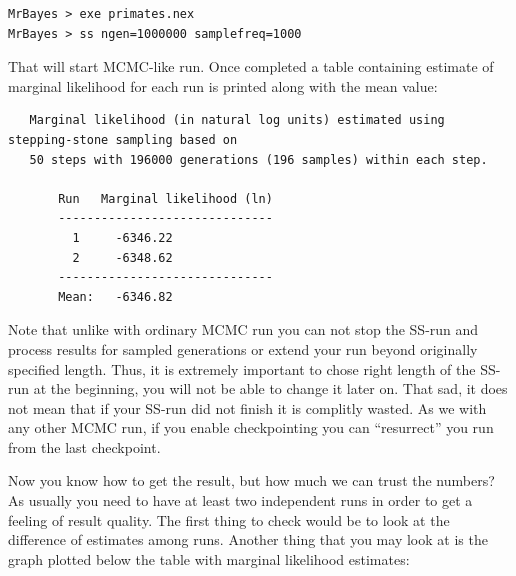 \documentclass[12pt]{book}
\begin{document}
\begin{singlespacing}
\begin{verbatim}
MrBayes > exe primates.nex
MrBayes > ss ngen=1000000 samplefreq=1000
\end{verbatim}
\end{singlespacing}

That will start MCMC-like run. Once completed a table containing estimate of marginal likelihood
for each run is printed along with the mean value:

\begin{singlespacing}
\scriptsize
\begin{verbatim}
   Marginal likelihood (in natural log units) estimated using stepping-stone sampling based on
   50 steps with 196000 generations (196 samples) within each step.

       Run   Marginal likelihood (ln)
       ------------------------------
         1     -6346.22
         2     -6348.62
       ------------------------------
       Mean:   -6346.82
\end{verbatim}
\normalsize
\end{singlespacing}

Note that unlike with ordinary MCMC run you can not stop the SS-run and process results for sampled
generations or extend your run beyond originally specified length. Thus, it is extremely important
to chose right length of the SS-run at the beginning, you will not be able to change it later on.
That sad, it does not mean that if your SS-run did not finish it is complitly wasted. As we with
any other MCMC run, if you enable checkpointing you can ``resurrect'' you run from the last
checkpoint.

Now you know how to get the result, but how much we can trust the numbers? As usually you need to
have at least two independent runs in order to get a feeling of result quality. The first thing to
check would be to look at the difference of estimates among runs. Another thing that you may look
at is the graph plotted below the table with marginal likelihood estimates:
\end{document}

